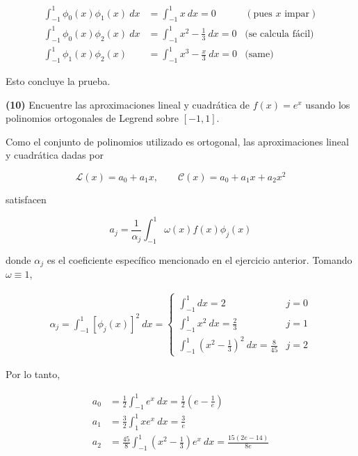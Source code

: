 \documentclass[12pt]{article}
\begin{document}
\begin{align*}
    \int_{-1}^1 \phi_0(x) \phi_1(x) ~ dx &= \int_{-1}^1 x ~ dx = 0 &(\text{pues }
    x \text{ impar}) \\  
    \int_{-1}^1 \phi_0(x) \phi_2(x) ~ dx &= \int_{-1}^1 x^2 - \frac{1}{3} ~ dx =
    0 &\text{(se calcula fácil)} \\ 
    \int_{-1}^1 \phi_1(x) \phi_2(x) &= \int_{-1}^1 x^3 - \frac{x}{3} ~ dx = 0 &
    \text{(same)}
\end{align*}

Esto concluye la prueba.


\pagebreak 

\begin{myframe}
\textbf{(10)} Encuentre las aproximaciones lineal y cuadrática de $f(x) = e^x$
usando los polinomios ortogonales de Legrend sobre $[-1, 1]$.
\end{myframe}

Como el conjunto de polinomios utilizado es ortogonal, las aproximaciones lineal
y cuadrática dadas por

\begin{equation*}
    \mathcal{L}(x) = a_0 + a_1 x, \qquad \mathcal{C}(x) = a_0 + a_1x + a_2x^2
\end{equation*}

satisfacen 

\begin{equation*}
    a_j = \frac{1}{\alpha_j} \int_{-1}^1 \omega(x) f(x) \phi_j(x)
\end{equation*}

donde $\alpha_j$ es el coeficiente específico mencionado en el ejercicio
anterior. Tomando $\omega \equiv 1$, 

\begin{align*}
    \alpha_j = \int_{-1}^1 \left[ \phi_j(x) \right]^2  ~ dx = \begin{cases}
        \int_{-1}^1 dx = 2 & j = 0 \\ 
        \int_{-1}^1 x^2 ~ dx = \frac{2}{3} & j = 1 \\ 
        \int_{-1}^1 (x^2 - \frac{1}{3})^2 ~ dx = \frac{8}{45} & j = 2
    \end{cases}
\end{align*}

Por lo tanto, 

\begin{align*}
a_0 &= \frac{1}{2} \int_{-1}^1 e^x ~ dx = \frac{1}{2}\left( e - \frac{1}{e}
    \right) \\ 
    a_1 &= \frac{3}{2}\int_{1}^1 x e^x ~ dx = \frac{3}{e} \\ 
    a_2 &= \frac{45}{8} \int_{-1}^1 (x^2 - \frac{1}{3})e^x ~ dx =
    \frac{15(2e-14)}{8e}
\end{align*}
\end{document}
